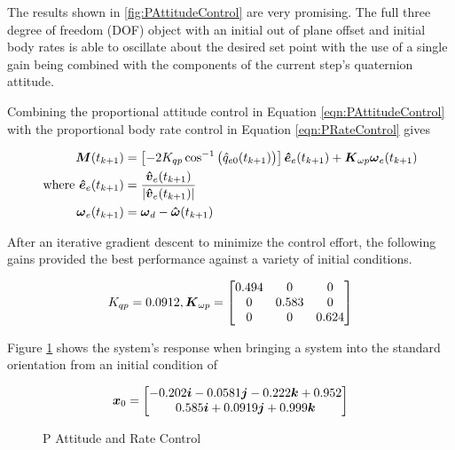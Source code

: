 The results shown in \ref{fig:PAttitudeControl} are very promising.  The full three degree of freedom (DOF) object with an initial out of plane offset and initial body rates is able to oscillate about the desired set point with the use of a single gain being combined with the components of the current step's quaternion attitude.

Combining the proportional attitude control in Equation \ref{eqn:PAttitudeControl} with the proportional body rate control in Equation \ref{eqn:PRateControl} gives

\begin{subequations}
  \begin{align}
    \boldsymbol{M}(t_{k+1}) &= \left[-2 K_{qp} \cos^{-1} \big(\hat{q}_{e0}(t_{k+1}) \big) \right] \boldsymbol{\hat{e}}_e(t_{k+1}) + \boldsymbol{K}_{\omega p} \boldsymbol{\omega}_e(t_{k+1})\\
    \text{where } \boldsymbol{\hat{e}}_e(t_{k+1}) &= \frac{\boldsymbol{\hat{v}}_e(t_{k+1})}{|\boldsymbol{\hat{v}}_e(t_{k+1})|} \\
    \boldsymbol{\omega}_e(t_{k+1}) &= \boldsymbol{\omega}_d - \boldsymbol{\hat{\omega}}(t_{k+1})
  \end{align}
  \label{eqn:PAttitudeAndRateControl}
\end{subequations}

After an iterative gradient descent to minimize the control effort, the following gains provided the best performance against a variety of initial conditions.

\begin{equation}
  K_{qp} = 0.0912, \boldsymbol{K}_{\omega p} = \begin{bmatrix} 0.494 & 0 & 0 \\ 0 & 0.583 & 0 \\ 0 & 0 & 0.624 \end{bmatrix}
\end{equation}

Figure \ref{fig:PAttitudeRateControl} shows the system's response when bringing a system into the standard orientation from an initial condition of

\begin{equation}
  \boldsymbol{x}_0 = \begin{bmatrix} -0.202 \boldsymbol{i} -0.0581 \boldsymbol{j} -0.222 \boldsymbol{k} +0.952 \\ 0.585 \boldsymbol{i} +0.0919 \boldsymbol{j} +0.999 \boldsymbol{k} \end{bmatrix}
\end{equation}

\begin{figure}[H]
  \centerline{}
  \caption{P Attitude and Rate Control}
  \label{fig:PAttitudeRateControl}
\end{figure}

